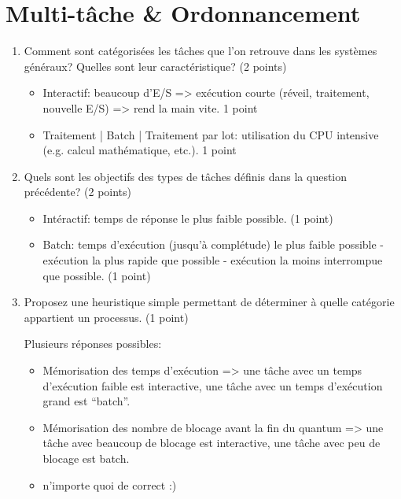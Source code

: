 \section{{Multi-tâche \& Ordonnancement}
         {\hfill{} }}

\begin{enumerate}

\item Comment sont catégorisées les tâches que l'on retrouve dans les systèmes généraux? Quelles sont leur caractéristique? (2 points)

\begin{correction}
\begin{itemize}
  \item Interactif: beaucoup d'E/S => exécution courte (réveil, traitement, nouvelle E/S) => rend la main vite.  1 point
  \item Traitement | Batch | Traitement par lot: utilisation du CPU intensive (e.g. calcul mathématique, etc.). 1 point
\end{itemize}
\end{correction}


\item Quels sont les objectifs des types de tâches définis dans la question précédente? (2 points)

\begin{correction}
\begin{itemize}
  \item Intéractif: temps de réponse le plus faible possible. (1 point)
  \item Batch: temps d'exécution (jusqu'à complétude) le plus faible possible - exécution la plus rapide que possible - exécution la moins interrompue que possible. (1 point)
\end{itemize}
\end{correction}


\item Proposez une heuristique simple permettant de déterminer à quelle catégorie appartient un processus. (1 point)

\begin{correction}
Plusieurs réponses possibles:
\begin{itemize}
  \item Mémorisation des temps d'exécution => une tâche avec un temps d'exécution faible est interactive, une tâche avec un temps d'exécution grand est “batch”.
  \item Mémorisation des nombre de blocage avant la fin du quantum => une tâche avec beaucoup de blocage est interactive, une tâche avec peu de blocage est batch.
  \item n'importe quoi de correct :)
\end{itemize}
\end{correction}



\end{enumerate}
